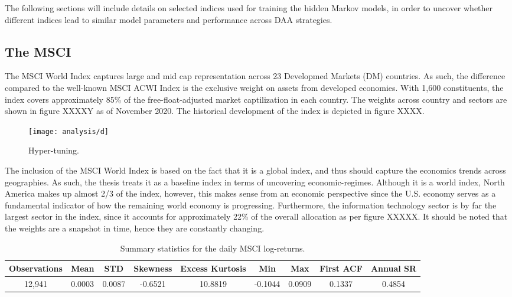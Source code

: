The following sections will include details on selected indices used for training the hidden Markov models, in order to uncover whether different indices lead to similar model parameters and performance across DAA strategies. 

\subsection{The MSCI}
\label{subsection: MSCI Index}
The MSCI World Index captures large and mid cap representation across 23 Developmed Markets (DM) countries. As such, the difference compared to the well-known MSCI ACWI Index is the exclusive weight on assets from developed economies. With 1,600 constituents, the index covers approximately 85\% of the free-float-adjusted market captilization in each country. The weights across country and sectors are shown in figure XXXXY as of November 2020. The historical development of the index is depicted in figure XXXX. 
 
\begin{figure}[H] 
    \centering
    \texttt{[image: analysis/d]}
    \caption{Hyper-tuning.}
    \label{fig:jump_penalties}
\end{figure}



The inclusion of the MSCI World Index is based on the fact that it is a global index, and thus should capture the economics trends across geographies. As such, the thesis treats it as a baseline index in terms of uncovering economic-regimes. Although it is a world index, North America makes up almost 2/3 of the index, however, this makes sense from an economic perspective since the U.S. economy serves as a fundamental indicator of how the remaining world economy is progressing. Furthermore, the information technology sector is by far the largest sector in the index, since it accounts for approximately 22\% of the overall allocation as per figure XXXXX. It should be noted that the weights are a snapshot in time, hence they are constantly changing. 

\begin{table}[H]
\caption{Summary statistics for the daily MSCI log-returns.}
\centering
\begin{tabular}{c c c c c c c c c} 
\hline\hline
Observations & Mean & STD & Skewness & Excess Kurtosis & Min & Max & First ACF & Annual SR \\
\hline
12,941 & 0.0003 & 0.0087 & -0.6521 & 10.8819 & -0.1044 & 0.0909 & 0.1337 & 0.4854 \\
\hline
\end{tabular}
\label{tab:summary_stats_MSCI}
\end{table}


